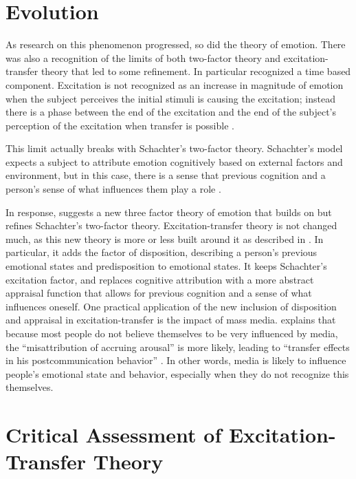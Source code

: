 \documentclass[
  stu]{apa7}
\begin{document}
\hypertarget{evolution}{%
\section{Evolution}\label{evolution}}

As research on this phenomenon progressed, so did the theory of emotion.
There was also a recognition of the limits of both two-factor theory and
excitation-transfer theory that led to some refinement. In particular
\textcite{canEnhancementExperiencedSexual} recognized a time based
component. Excitation is not recognized as an increase in magnitude of
emotion when the subject perceives the initial stimuli is causing the
excitation; instead there is a phase between the end of the excitation
and the end of the subject's perception of the excitation when transfer
is possible \autocite{canEnhancementExperiencedSexual}.

This limit actually breaks with Schachter's two-factor theory.
Schachter's model expects a subject to attribute emotion cognitively
based on external factors and environment, but in this case, there is a
sense that previous cognition and a person's sense of what influences
them play a role \autocite[ 40]{bryExcitationTransferTheoryThreeFactor}.

In response, \textcite{tanEmotionalArousalFacilitation} suggests a new
three factor theory of emotion that builds on but refines Schachter's
two-factor theory. Excitation-transfer theory is not changed much, as
this new theory is more or less built around it as described in
\textcite{canEnhancementExperiencedSexual}. In particular, it adds the
factor of disposition, describing a person's previous emotional states
and predisposition to emotional states. It keeps Schachter's excitation
factor, and replaces cognitive attribution with a more abstract
appraisal function that allows for previous cognition and a sense of
what influences oneself. One practical application of the new inclusion
of disposition and appraisal in excitation-transfer is the impact of
mass media. \textcite{tanEmotionalArousalFacilitation} explains that
because most people do not believe themselves to be very influenced by
media, the ``misattribution of accruing arousal'' is more likely,
leading to ``transfer effects in his postcommunication behavior''
\autocite[ 187]{tanEmotionalArousalFacilitation}. In other words, media
is likely to influence people's emotional state and behavior, especially
when they do not recognize this themselves.

\hypertarget{critical-assessment-of-excitation-transfer-theory}{%
\section{Critical Assessment of Excitation-Transfer
Theory}\label{critical-assessment-of-excitation-transfer-theory}}
\end{document}
